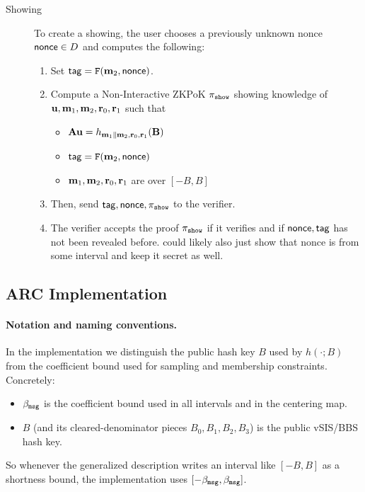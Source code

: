 \begin{description}
    \item[Showing] To create a showing, the user chooses a previously unknown nonce $\mathsf{nonce}\in D$ and computes the following:
    \begin{enumerate}
        \item Set $\mathsf{tag}=\mathtt{F}(\mathbf{m}_2,\mathsf{nonce})$.
        \item Compute a Non-Interactive ZKPoK $\pi_{\mathtt{show}}$ showing knowledge of $\mathbf{u},\mathbf{m}_1,\mathbf{m}_2,\mathbf{r}_0,\mathbf{r}_1$ such that
        \begin{itemize}
            \item $\mathbf{A}\mathbf{u}= h_{\mathbf{m}_1\|\mathbf{m}_2,\mathbf{r}_0,\mathbf{r}_1}(\mathbf{B})$ 
            \item $\mathsf{tag}=\mathtt{F}(\mathbf{m}_2,\mathsf{nonce})$
            \item $\mathbf{m}_1,\mathbf{m}_2,\mathbf{r}_0,\mathbf{r}_1$ are over $[-B,B]$
        \end{itemize}
        \item Then, send $\mathsf{tag},\mathsf{nonce},\pi_{\mathtt{show}}$ to the verifier. 
        \item The verifier accepts the proof $\pi_{\mathtt{show}}$ if it verifies and if $\mathsf{nonce},\mathsf{tag}$ has not been revealed before. {\color{blue} could likely also just show that nonce is from some interval and keep it secret as well.}
    \end{enumerate}
\end{description}


\subsection{ARC Implementation}


\paragraph{Notation and naming conventions.}
In the implementation we distinguish the public hash key $B$ used by $h(\cdot;B)$ from the coefficient bound used
for sampling and membership constraints. Concretely:
\begin{itemize}
  \item \texttt{$\beta_{\mathtt{msg}}$} is the coefficient bound used in all intervals and in the centering map.
  \item $B$ (and its cleared-denominator pieces $B_0,B_1,B_2,B_3$) is the public vSIS/BBS hash key.
\end{itemize}
So whenever the generalized description writes an interval like $[-B,B]$ as a shortness bound, the implementation
uses $[-\beta_{\mathtt{msg}},\beta_{\mathtt{msg}}]$.

